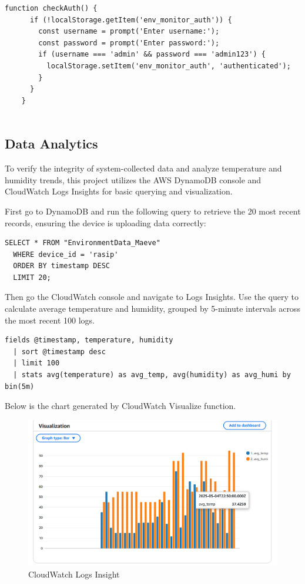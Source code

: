 \documentclass[12pt,a4paper]{article}
\begin{document}
\begin{lstlisting}[style=classicpython,caption={checkAuth Code Snippet},captionpos=b]
  function checkAuth() {
      if (!localStorage.getItem('env_monitor_auth')) {
        const username = prompt('Enter username:'); 
        const password = prompt('Enter password:'); 
        if (username === 'admin' && password === 'admin123') {
          localStorage.setItem('env_monitor_auth', 'authenticated');
        }
      }
    }
    
  \end{lstlisting}



\subsection{Data Analytics}
To verify the integrity of system-collected data and analyze temperature and humidity trends, this project utilizes the AWS DynamoDB console and CloudWatch Logs Insights for basic querying and visualization.

\vspace{\baselineskip}
\noindent
First go to DynamoDB and run the following query to retrieve the 20 most recent records, ensuring the device is uploading data correctly:
\begin{lstlisting}[style=maevesql, caption={query the data}]
  SELECT * FROM "EnvironmentData_Maeve"
  WHERE device_id = 'rasip'
  ORDER BY timestamp DESC 
  LIMIT 20;  
\end{lstlisting}


\noindent
Then go the CloudWatch console and navigate to Logs Insights. Use the query to calculate average temperature and humidity, grouped by 5-minute intervals across the most recent 100 logs.
\begin{lstlisting}[style=maevesql, caption={query the data}]
  fields @timestamp, temperature, humidity
  | sort @timestamp desc
  | limit 100
  | stats avg(temperature) as avg_temp, avg(humidity) as avg_humi by bin(5m)
\end{lstlisting}

Below is the chart generated by CloudWatch Visualize function.

\begin{figure}[h!]
  \centering
  \includegraphics[width=0.75\linewidth]{figures/analysis.png}
  \caption{CloudWatch Logs Insight}
\end{figure}
\end{document}
